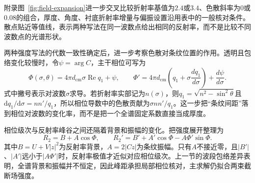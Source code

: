 附录图~\ref{fig:field-expansion}进一步交叉比较折射率基值为$2.4$或$3.4$、色散斜率为$0$或$0.08$的组合，厚度、角度、衬底折射率增量与偏振设置沿用表中的一般核对条件。散点贴近等值线，表示两种写法在同一波数点给出相同的反射率，而不是比较不同波数点的光谱形状。



两种强度写法的代数一致性确定后，进一步考察色散对条纹位置的作用。透明且包络变化较慢时，令$\psi=\arg C$，主干相位可写为
\begin{equation}
\Phi(\sigma,\theta)=4\pi d_{\mathrm{cm}}\sigma\operatorname{Re}q_1+\psi,\qquad
\Phi'=4\pi d_{\mathrm{cm}}\left(q_1+\sigma\frac{dq_1}{d\sigma}\right)+\frac{d\psi}{d\sigma}.
\end{equation}
式中撇号表示对波数$\sigma$求导。若折射率实部记为$n(\sigma)$，则$q_1=\sqrt{n^2-\sin^2\theta}$且$\mathrm{d}q_1/\mathrm{d}\sigma=nn'/q_1$，所以相位导数中的色散贡献为$\sigma nn'/q_1$。这一步把“条纹间距”落到相位对波数的变化率，而不是把一个全谱固定系数直接当成厚度。

相位级次与反射率峰谷之间还隔着背景和振幅的变化。把强度展开整理为
\begin{equation}
R_2=B+A\cos\Phi,\qquad
R_2'=B'+A'\cos\Phi-A\Phi'\sin\Phi.
\end{equation}
其中$B=U+V|z|^2$为反射率背景，$A=2|Cz|$为条纹振幅。只有$A$不接近零，且$|B'|$、$|A'|$远小于$|A\Phi'|$时，反射率极值才近似对应相位级次。上一节的波段包络差异表明，全谱背景和振幅并不恒定，因此峰距承担局部相位核对，主求解仍拟合两束截断场强度。

